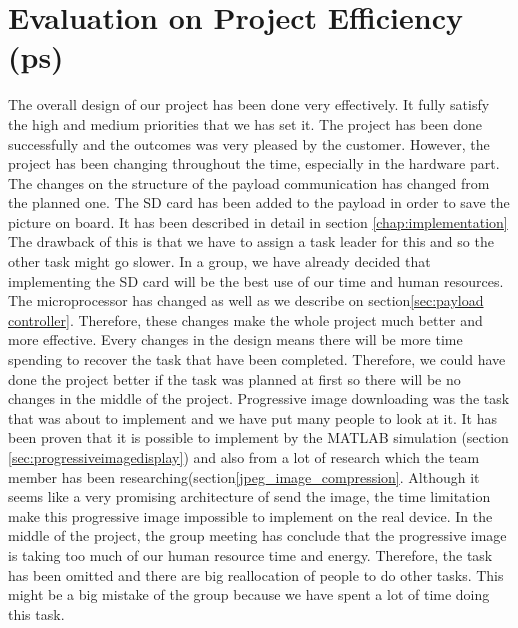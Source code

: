\section{Evaluation on Project Efficiency (ps)}
The overall design of our project has been done very effectively.
It fully satisfy the high and medium priorities that we has set it.
The project has been done successfully and the outcomes was very pleased by the customer.
However, the project has been changing throughout the time, especially in the hardware part.
The changes on the structure of the payload communication has changed from the planned one.
The SD card has been added to the payload in order to save the picture on board.
It has been described in detail in section \ref{chap:implementation}
The drawback of this is that we have to assign a task leader for this and so the other task might go slower.
In a group, we have already decided that implementing the SD card will be the best use of our time and human resources.
The microprocessor has changed as well as we describe on section\ref{sec:payload controller}.
Therefore, these changes make the whole project much better and more effective.
Every changes in the design means there will be more time spending to recover the task that have been completed. 
Therefore, we could have done the project better if the task was planned at first so there will be no changes in the middle of the project.
Progressive image downloading was the task that was about to implement and we have put many people to look at it. 
It has been proven that it is possible to implement by the MATLAB simulation (section \ref{sec:progressiveimagedisplay}) and also from a lot of research which the team member has been researching(section\ref{jpeg_image_compression}.
Although it seems like a very promising architecture of send the image, the time limitation make this progressive image impossible to implement on the real device.
In the middle of the project, the group meeting has conclude that the progressive image is taking too much of our human resource time and energy.
Therefore, the task has been omitted and there are big reallocation of people to do other tasks.
This might be a big mistake of the group because we have spent a lot of time doing this task.

